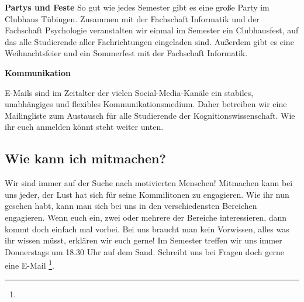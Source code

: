 \pagebreak

\textbf{Partys und Feste}
So gut wie jedes Semester gibt es eine große Party im Clubhaus Tübingen. Zusammen mit der Fachschaft Informatik und der Fachschaft Psychologie veranstalten wir einmal im Semester ein Clubhausfest, auf das alle Studierende aller Fachrichtungen eingeladen sind. Außerdem gibt es eine Weihnachtsfeier und ein Sommerfest mit der Fachschaft Informatik.

\textbf{Kommunikation}

E-Mails sind im Zeitalter der vielen Social-Media-Kanäle ein stabiles, unabhängiges und flexibles Kommunikationsmedium. Daher betreiben wir eine Mailingliste zum Austausch für alle Studierende der Kognitionswissenschaft. Wie ihr euch anmelden könnt steht weiter unten. \\

\subsection{Wie kann ich mitmachen?}
Wir sind immer auf der Suche nach motivierten Menschen! Mitmachen kann bei uns jeder, der Lust hat sich für seine Kommilitonen zu engagieren. Wie ihr nun gesehen habt, kann man sich bei uns in den verschiedensten Bereichen engagieren. Wenn euch ein, zwei oder mehrere der Bereiche interessieren, dann kommt doch einfach mal vorbei. Bei uns braucht man kein Vorwissen, alles was ihr wissen müsst, erklären wir euch gerne!
Im Semester treffen wir uns immer Donnerstags um 18.30 Uhr auf dem Sand. Schreibt uns bei Fragen doch gerne eine E-Mail \footnote{}.


